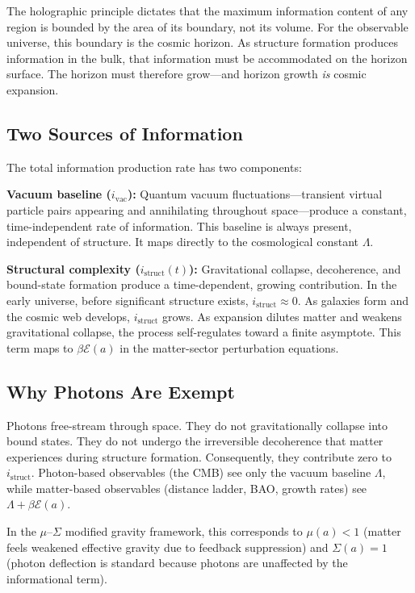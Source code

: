\documentclass[11pt]{article}
\begin{document}
The holographic principle dictates that the maximum information content of any region is bounded by the area of its boundary, not its volume. For the observable universe, this boundary is the cosmic horizon. As structure formation produces information in the bulk, that information must be accommodated on the horizon surface. The horizon must therefore grow---and horizon growth \textit{is} cosmic expansion.

\subsection{Two Sources of Information}

The total information production rate has two components:

\textbf{Vacuum baseline ($i_\text{vac}$):} Quantum vacuum fluctuations---transient virtual particle pairs appearing and annihilating throughout space---produce a constant, time-independent rate of information. This baseline is always present, independent of structure. It maps directly to the cosmological constant $\Lambda$.

\textbf{Structural complexity ($i_\text{struct}(t)$):} Gravitational collapse, decoherence, and bound-state formation produce a time-dependent, growing contribution. In the early universe, before significant structure exists, $i_\text{struct} \approx 0$. As galaxies form and the cosmic web develops, $i_\text{struct}$ grows. As expansion dilutes matter and weakens gravitational collapse, the process self-regulates toward a finite asymptote. This term maps to $\beta\mathcal{E}(a)$ in the matter-sector perturbation equations.

\subsection{Why Photons Are Exempt}

Photons free-stream through space. They do not gravitationally collapse into bound states. They do not undergo the irreversible decoherence that matter experiences during structure formation. Consequently, they contribute zero to $i_\text{struct}$. Photon-based observables (the CMB) see only the vacuum baseline $\Lambda$, while matter-based observables (distance ladder, BAO, growth rates) see $\Lambda + \beta\mathcal{E}(a)$.

In the $\mu$--$\Sigma$ modified gravity framework, this corresponds to $\mu(a) < 1$ (matter feels weakened effective gravity due to feedback suppression) and $\Sigma(a) = 1$ (photon deflection is standard because photons are unaffected by the informational term).
\end{document}
